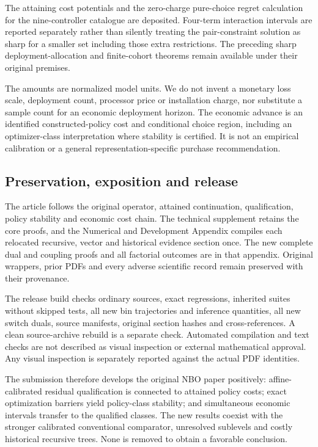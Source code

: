 \documentclass[ecta,nameyear,draft]{econsocart}
\begin{document}
The attaining cost potentials and the zero-charge pure-choice regret
calculation for the nine-controller catalogue are deposited. Four-term
interaction intervals are reported separately rather than silently
treating the pair-constraint solution as sharp for a smaller set
including those extra restrictions. The preceding sharp
deployment-allocation and finite-cohort theorems remain available under
their original premises.

The amounts are normalized model units. We do not invent a monetary loss
scale, deployment count, processor price or installation charge, nor
substitute a sample count for an economic deployment horizon. The
economic advance is an identified constructed-policy cost and
conditional choice region, including an optimizer-class interpretation
where stability is certified. It is not an empirical calibration or a
general representation-specific purchase recommendation.

\hypertarget{preservation-exposition-and-release}{%
\subsection{Preservation, exposition and
release}\label{preservation-exposition-and-release}}

The article follows the original operator, attained continuation,
qualification, policy stability and economic cost chain. The technical
supplement retains the core proofs, and the Numerical and Development
Appendix compiles each relocated recursive, vector and historical
evidence section once. The new complete dual and coupling proofs and all
factorial outcomes are in that appendix. Original wrappers, prior PDFs
and every adverse scientific record remain preserved with their
provenance.

The release build checks ordinary sources, exact regressions, inherited
suites without skipped tests, all new bin trajectories and inference
quantities, all new switch duals, source manifests, original section
hashes and cross-references. A clean source-archive rebuild is a
separate check. Automated compilation and text checks are not described
as visual inspection or external mathematical approval. Any visual
inspection is separately reported against the actual PDF identities.

The submission therefore develops the original NBO paper positively:
affine-calibrated residual qualification is connected to attained policy
costs; exact optimization barriers yield policy-class stability; and
simultaneous economic intervals transfer to the qualified classes. The
new results coexist with the stronger calibrated conventional
comparator, unresolved sublevels and costly historical recursive trees.
None is removed to obtain a favorable conclusion.
\end{document}
